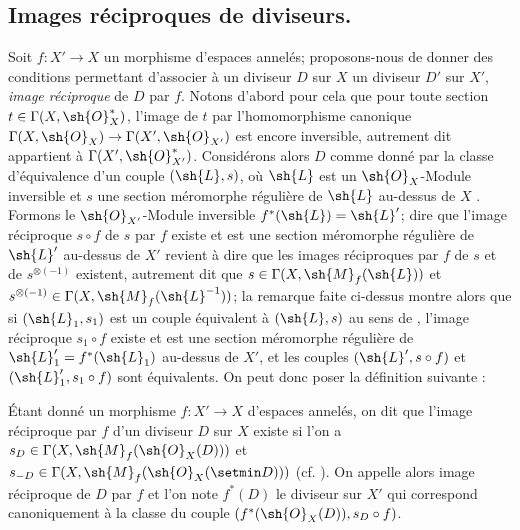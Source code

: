 \subsection{Images réciproques de diviseurs.}
\label{IV.21.4}

\begin{env}[21.4.1]
Soit $f:X'\to X$ un morphisme d'espaces annelés;
proposons-nous de donner des conditions permettant d'associer à un diviseur $D$ sur $X$ un diviseur $D'$ sur $X'$, \emph{image réciproque} de $D$ par $f$.
Notons d'abord pour cela que pour toute section $t\in\Gamma(X,\sh{O}_X^*)$, l'image de $t$ par l'homomorphisme canonique $\Gamma(X,\sh{O}_X)\to\Gamma(X',\sh{O}_{X'})$ est encore inversible, autrement dit appartient à $\Gamma(X',\sh{O}_{X'}^*)$.
Considérons alors $D$ comme donné par la classe d'équivalence d'un couple $(\sh{L},s)$, où $\sh{L}$ est un $\sh{O}_X$-Module inversible et $s$ une section méromorphe régulière de $\sh{L}$ au-dessus de $X$ .
Formons le $\sh{O}_{X'}$-Module inversible $f^*(\sh{L})=\sh{L}'$;
dire que l'image réciproque $s\circ f$ de $s$ par $f$ existe  et est une section méromorphe régulière de $\sh{L}'$ au-dessus de $X'$ revient à dire que les images réciproques par $f$ de $s$ et de $s^{\otimes(-1)}$ existent, autrement dit que $s\in\Gamma(X,\sh{M}_f(\sh{L}))$ et $s^{\otimes(-1)}\in\Gamma(X,\sh{M}_f(\sh{L}^{-1}))$;
la remarque faite ci-dessus montre alors que si $(\sh{L}_1,s_1)$ est un couple équivalent à $(\sh{L},s)$ au sens de , l'image réciproque $s_1\circ f$ existe et est une section méromorphe régulière de $\sh{L}_1'=f^*(\sh{L}_1)$ au-dessus de $X'$, et les couples $(\sh{L}',s\circ f)$ et $(\sh{L}_1',s_1\circ f)$ sont équivalents.
On peut donc poser la définition suivante :
\end{env}

\begin{definition}[21.4.2]
Étant donné un morphisme $f:X'\to X$ d'espaces annelés, on dit que l'image réciproque par $f$ d'un diviseur $D$ sur $X$ existe si l'on a $s_D\in\Gamma(X,\sh{M}_f(\sh{O}_X(D)))$ et $s_{-D}\in\Gamma(X,\sh{M}_f(\sh{O}_X(\setmin D)))$ \textup{(cf. )}.
On appelle alors image réciproque de $D$ par $f$ et l'on note $f^*(D)$ le diviseur sur $X'$ qui correspond canoniquement  à la classe du couple $(f^*(\sh{O}_X(D)),s_D\circ f)$.
\end{definition}

